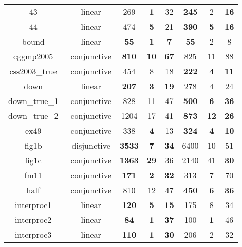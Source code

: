 \begin{table}[t]
\begin{tabular}{l c | c c c | c c c |}
\multicolumn{1}{|c|}{43~\cite{isil2013inductive}}				&linear			&269	&\textbf{1}	&32					       &\textbf{245}	&2	&\textbf{16}		\\
\multicolumn{1}{|c|}{44~\cite{isil2013inductive}}				&linear 		&474	&\textbf{5}	&21	&\textbf{390}	&\textbf{5}	&\textbf{16}\\
\multicolumn{1}{|c|}{bound~\cite{gupta2009invgen}}				&linear 		&\textbf{55}	&\textbf{1}	&\textbf{7}	&\textbf{55}	&2	&8\\
\multicolumn{1}{|c|}{cggmp2005~\cite{Dirk:SVCOMP:2016}}			&conjunctive	&\textbf{810}	&\textbf{10}	&\textbf{67}	&825	&11	&88\\
\multicolumn{1}{|c|}{css2003\_true~\cite{Dirk:SVCOMP:2016}}		&conjunctive		&454	&8	&18	&\textbf{222}	&\textbf{4}	&\textbf{11}\\
\multicolumn{1}{|c|}{down~\cite{gupta2009invgen}}				&linear			&\textbf{207}	&\textbf{3}	&\textbf{19}       &278	&4	&24								\\
\multicolumn{1}{|c|}{down\_true\_1~\cite{Dirk:SVCOMP:2016}}		&conjunctive 	&828	&11	&47	&\textbf{500}	&\textbf{6}	&\textbf{36}\\
\multicolumn{1}{|c|}{down\_true\_2~\cite{Dirk:SVCOMP:2016}}		&conjunctive 	&1204	&17	&41	&\textbf{873}	&\textbf{12}	&\textbf{26}\\
\multicolumn{1}{|c|}{ex49~\cite{necla:benchmark}}				&conjunctive	&338	&\textbf{4}	&13	&\textbf{324}	&\textbf{4}	&\textbf{10}\\
\multicolumn{1}{|c|}{fig1b~\cite{zilu:repo}}					&disjunctive	&\textbf{3533} 	& \textbf{7} &\textbf{34} 	   & 6400 & 10 		& 51 					\\
\multicolumn{1}{|c|}{fig1c~\cite{zilu:repo}}					&conjunctive	&\textbf{1363}	&\textbf{29}	&36	&2140	&41	&\textbf{30}\\
\multicolumn{1}{|c|}{fm11~\cite{schwartznon}}					&conjunctive	&\textbf{171}	&\textbf{2}	&\textbf{32}       &313	&7	&70								\\
\multicolumn{1}{|c|}{half~\cite{gupta2009invgen}}				&conjunctive	&810	&12	&47 &\textbf{450}	&\textbf{6}	&\textbf{36}\\
\multicolumn{1}{|c|}{interproc1~\cite{jeannet2010interproc}}	&linear			&\textbf{120}	&\textbf{5}	&\textbf{15}   &175	&8	&34									\\
\multicolumn{1}{|c|}{interproc2~\cite{jeannet2010interproc}}	&linear 		&\textbf{84}	&\textbf{1}	&\textbf{37}	&100	&\textbf{1}	&46\\
\multicolumn{1}{|c|}{interproc3~\cite{jeannet2010interproc}}	&linear			&\textbf{110}	&\textbf{1}	&\textbf{30}   &206	&2	&32									\\

\end{tabular}
\end{table}
